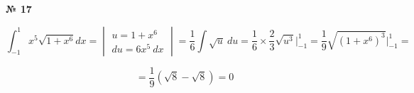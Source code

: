 \documentclass{article}
\begin{document}
\textbf{№ 17} 

$$ \int_{-1}^{1} x^5 \sqrt{1+x^6} dx 
 = \begin{vmatrix}  u  = 1+x^6 \\ 
                    du = 6x^5 \ dx \end{vmatrix}
= \frac{1}{6} \int \sqrt{u} \ du
= \frac{1}{6} \times \frac{2}{3} \sqrt{u^3} \bigg\vert_{-1}^{1}
= \frac{1}{9} \sqrt{(1+x^6)^3} \bigg\vert_{-1}^{1}
= $$

$$ = \frac{1}{9} (\sqrt{8} - \sqrt{8}) 
= 0 $$
\end{document}
